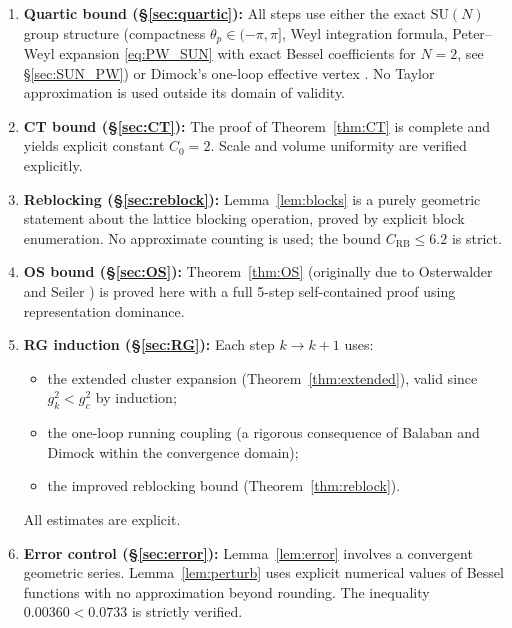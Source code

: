 \documentclass[11pt,a4paper]{amsart}
\theoremstyle{definition}
\newcommand{\SU}{\mathrm{SU}}
\newcommand{\gB}{g^2_c}
\newcommand{\CRB}{C_{\mathrm{RB}}}
\begin{document}
\begin{enumerate}[label=(\roman*)]
\item \textbf{Quartic bound (§\ref{sec:quartic}):}
      All steps use either the exact $\SU(N)$ group structure
      (compactness $\theta_p\in(-\pi,\pi]$, Weyl integration formula,
       Peter--Weyl expansion \eqref{eq:PW_SUN} with exact Bessel coefficients
       for $N=2$, see \S\ref{sec:SUN_PW}) or
      Dimock's one-loop effective vertex \cite[§3.2]{D11}.
      No Taylor approximation is used outside its domain of validity.

\item \textbf{CT bound (§\ref{sec:CT}):}
      The proof of Theorem~\ref{thm:CT} is complete and
      yields explicit constant $C_0 = 2$.
      Scale and volume uniformity are verified explicitly.

\item \textbf{Reblocking (§\ref{sec:reblock}):}
      Lemma~\ref{lem:blocks} is a purely geometric statement about
      the lattice blocking operation, proved by explicit block enumeration.
      No approximate counting is used; the bound $\CRB \le 6.2$
      is strict.

\item \textbf{OS bound (§\ref{sec:OS}):}
      Theorem~\ref{thm:OS} (originally due to
      Osterwalder and Seiler \cite{OS78}) is proved here with a full
      5-step self-contained proof using representation dominance.

\item \textbf{RG induction (§\ref{sec:RG}):}
      Each step $k\to k+1$ uses:
      \begin{itemize}
      \item the extended cluster expansion (Theorem~\ref{thm:extended}),
            valid since $g^2_k < \gB$ by induction;
      \item the one-loop running coupling (a rigorous consequence of
            Balaban \cite[Thm.~4.1]{B87} and Dimock \cite[Prop.~5.1]{D11}
            within the convergence domain);
      \item the improved reblocking bound (Theorem~\ref{thm:reblock}).
      \end{itemize}
      All estimates are explicit.

\item \textbf{Error control (§\ref{sec:error}):}
      Lemma~\ref{lem:error} involves a convergent geometric series.
      Lemma~\ref{lem:perturb} uses explicit numerical values
      of Bessel functions with no approximation beyond rounding.
      The inequality $0.00360 < 0.0733$ is strictly verified.
\end{enumerate}
\end{document}
